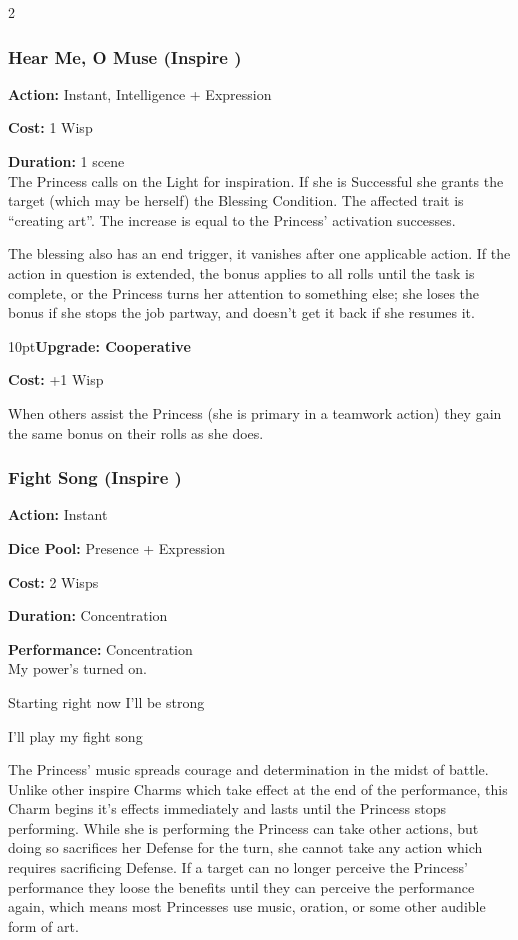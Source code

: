 \begin{multicols}{2}
\subsubsection*{Hear Me, O Muse (Inspire \textbullet)}

\noindent \textbf{Action:} Instant, Intelligence + Expression

\noindent \textbf{Cost:} 1 Wisp

\noindent \textbf{Duration:} 1 scene \\

\noindent The Princess calls on the Light for inspiration. If she is Successful she grants the target (which may be herself) the Blessing Condition. The affected trait is \textquotedblleft creating art\textquotedblright. The increase is equal to the Princess' activation successes. 

The blessing also has an end trigger, it vanishes after one applicable action. If the action in question is extended, the bonus applies to all rolls until the task is complete, or the Princess turns her attention to something else; she loses the bonus if she stops the job partway, and doesn't get it back if she resumes it.

\begin{myindentpar}{10pt}\textbf{Upgrade: Cooperative}

\noindent \textbf{Cost:} +1 Wisp

When others assist the Princess (she is primary in a teamwork action) they gain the same bonus on their rolls as she does.\end{myindentpar}

\subsubsection*{Fight Song (Inspire \textbullet)}

\noindent \textbf{Action:} Instant

\noindent \textbf{Dice Pool:} Presence + Expression

\noindent \textbf{Cost:} 2 Wisps

\noindent \textbf{Duration:} Concentration

\noindent \textbf{Performance:} Concentration\\

\noindent My power's turned on.

Starting right now I'll be strong

I'll play my fight song

The Princess' music spreads courage and determination in the midst of battle. Unlike other inspire Charms which take effect at the end of the performance, this Charm begins it's effects immediately and lasts until the Princess stops performing. While she is performing the Princess can take other actions, but doing so sacrifices her Defense for the turn, she cannot take any action which requires sacrificing Defense. If a target can no longer perceive the Princess' performance they loose the benefits until they can perceive the performance again, which means most Princesses use music, oration, or some other audible form of art. 


\end{multicols}
